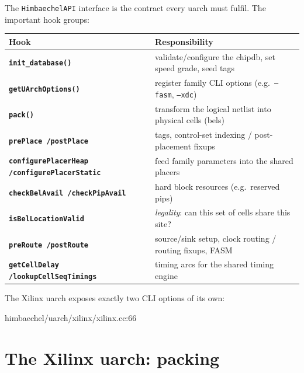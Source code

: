 \documentclass[11pt,a4paper]{article}
\begin{document}
The \texttt{HimbaechelAPI} interface is the contract every uarch must
fulfil. The important hook groups:

\begin{center}
\small\sffamily
\begin{tabularx}{\textwidth}{>{\bfseries\color{accent1}}l X}
\toprule
Hook & Responsibility \\
\midrule
\texttt{init\_database()} & validate/configure the chipdb, set speed grade, seed tags \\
\texttt{getUArchOptions()} & register family CLI options (e.g.\ \texttt{--fasm}, \texttt{--xdc}) \\
\texttt{pack()} & transform the logical netlist into physical cells (bels) \\
\texttt{prePlace /\newline postPlace} & tags, control-set indexing / post-placement fixups \\
\texttt{configurePlacerHeap /\newline configurePlacerStatic} & feed family parameters into the shared placers \\
\texttt{checkBelAvail /\newline checkPipAvail} & hard block resources (e.g.\ reserved pips) \\
\texttt{isBelLocationValid} & \emph{legality}: can this set of cells share this site? \\
\texttt{preRoute /\newline postRoute} & source/sink setup, clock routing / routing fixups, FASM \\
\texttt{getCellDelay /\newline lookupCellSeqTimings} & timing arcs for the shared timing engine \\
\bottomrule
\end{tabularx}
\end{center}

The Xilinx uarch exposes exactly two CLI options of its own:

\begin{cppfile}{himbaechel/uarch/xilinx/xilinx.cc:66}
  
\end{cppfile}

\section{The Xilinx uarch: packing}
\end{document}

